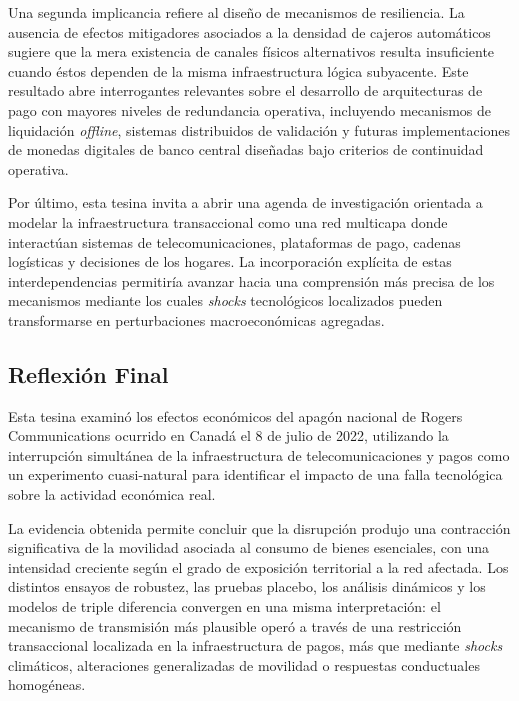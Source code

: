 Una segunda implicancia refiere al dise\~no de mecanismos de resiliencia. La ausencia de efectos mitigadores asociados a la densidad de cajeros autom\'aticos sugiere que la mera existencia de canales f\'isicos alternativos resulta insuficiente cuando \'estos dependen de la misma infraestructura l\'ogica subyacente. Este resultado abre interrogantes relevantes sobre el desarrollo de arquitecturas de pago con mayores niveles de redundancia operativa, incluyendo mecanismos de liquidaci\'on \textit{offline}, sistemas distribuidos de validaci\'on y futuras implementaciones de monedas digitales de banco central dise\~nadas bajo criterios de continuidad operativa.

Por \'ultimo, esta tesina invita a abrir una agenda de investigaci\'on orientada a modelar la infraestructura transaccional como una red multicapa donde interact\'uan sistemas de telecomunicaciones, plataformas de pago, cadenas log\'isticas y decisiones de los hogares. La incorporaci\'on expl\'icita de estas interdependencias permitir\'ia avanzar hacia una comprensi\'on m\'as precisa de los mecanismos mediante los cuales \textit{shocks} tecnol\'ogicos localizados pueden transformarse en perturbaciones macroecon\'omicas agregadas.

\subsection{Reflexi\'on Final}
\label{sec:8_2}

Esta tesina examin\'o los efectos econ\'omicos del apag\'on nacional de Rogers Communications ocurrido en Canad\'a el 8 de julio de 2022, utilizando la interrupci\'on simult\'anea de la infraestructura de telecomunicaciones y pagos como un experimento cuasi-natural para identificar el impacto de una falla tecnol\'ogica sobre la actividad econ\'omica real.

La evidencia obtenida permite concluir que la disrupci\'on produjo una contracci\'on significativa de la movilidad asociada al consumo de bienes esenciales, con una intensidad creciente seg\'un el grado de exposici\'on territorial a la red afectada. Los distintos ensayos de robustez, las pruebas placebo, los an\'alisis din\'amicos y los modelos de triple diferencia convergen en una misma interpretaci\'on: el mecanismo de transmisi\'on m\'as plausible oper\'o a trav\'es de una restricci\'on transaccional localizada en la infraestructura de pagos, m\'as que mediante \textit{shocks} clim\'aticos, alteraciones generalizadas de movilidad o respuestas conductuales homog\'eneas.

